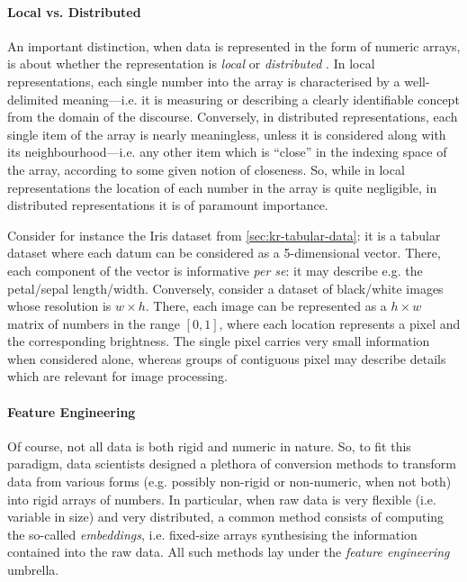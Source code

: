 \documentclass[12pt,a4paper,openright,twoside]{book}
\begin{document}
\paragraph{Local vs. Distributed}

An important distinction, when data is represented in the form of numeric arrays, is about whether the representation is \emph{local} or \emph{distributed} \cite{Gelder90}.
%
In local representations, each single number into the array is characterised by a well-delimited meaning---i.e. it is measuring or describing a clearly identifiable concept from the domain of the discourse.
%
Conversely, in distributed representations, each single item of the array is nearly meaningless, unless it is considered along with its neighbourhood---i.e. any other item which is ``close'' in the indexing space of the array, according to some given notion of closeness.
%
So, while in local representations the location of each number in the array is quite negligible, in distributed representations it is of paramount importance.

Consider for instance the Iris dataset from \cref{sec:kr-tabular-data}: it is a tabular dataset where each datum can be considered as a 5-dimensional vector.
%
There, each component of the vector is informative \emph{per se}: it may describe e.g. the petal/sepal length/width.
%
Conversely, consider a dataset of black/white images whose resolution is $w \times h$.
%
There, each image can be represented as a $h \times w$ matrix of numbers in the range $[0, 1]$, where each location represents a pixel and the corresponding brightness.
%
The single pixel carries very small information when considered alone, whereas groups of contiguous pixel may describe details which are relevant for image processing.

\paragraph{Feature Engineering}

Of course, not all data is both rigid and numeric in nature.
%
So, to fit this paradigm, data scientists designed a plethora of conversion methods to transform data from various forms (e.g. possibly non-rigid or non-numeric, when not both) into rigid arrays of numbers.
%
In particular, when raw data is very flexible (i.e. variable in size) and very distributed, a common method consists of computing the so-called \emph{embeddings}, i.e. fixed-size arrays synthesising the information contained into the raw data.
%
All such methods lay under the \emph{feature engineering} umbrella.
\end{document}
